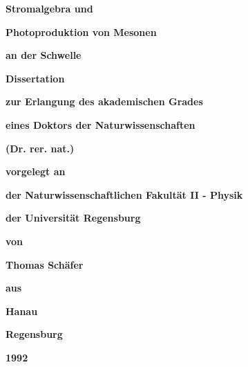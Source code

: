 %
%                                                                       
%
\textwidth16.0cm
\voffset-1.5cm
\hoffset-1.5cm
%
%

\baselineskip18pt
\parindent0pt
\begin{titlepage}
\centerline{\huge \bf Stromalgebra und}
\vspace{0.8cm}
\centerline{\huge \bf Photoproduktion von Mesonen}
\vspace{0.8cm}
\centerline{\huge \bf an der Schwelle}  
\vspace{2.5cm}
\centerline{\bf Dissertation}
\centerline{\bf zur Erlangung des akademischen Grades}
\centerline{\bf eines Doktors der Naturwissenschaften}
\centerline{\bf (Dr. rer. nat.)}
\vspace{2.0cm}
\centerline{\bf vorgelegt an}
\centerline{\bf der Naturwissenschaftlichen Fakult\"at II - Physik}
\centerline{\bf der Universit\"at Regensburg}
\vspace{2.5cm}
\centerline{\bf von}
\centerline{\bf Thomas Sch\"afer }
\centerline{\bf aus}
\centerline{\bf Hanau} 
\vspace{1cm}
\centerline{\bf Regensburg}
\centerline{\bf 1992}
\vspace{0.5cm}
\end{titlepage}
\pagestyle{empty}


